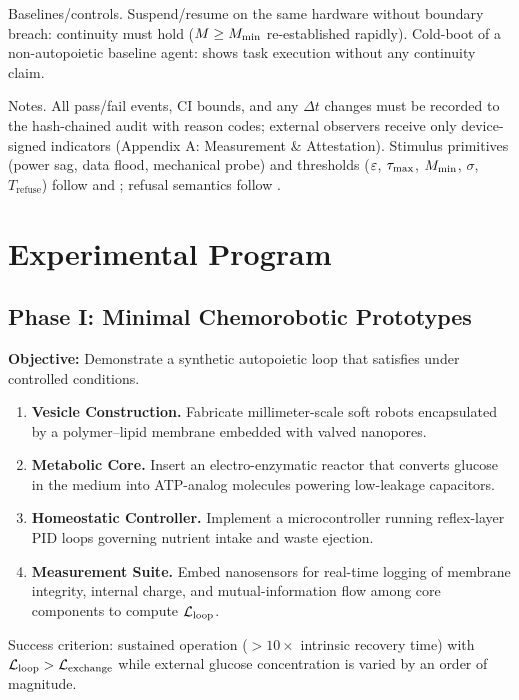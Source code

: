 \documentclass[11pt]{article}
\begin{document}
Baselines/controls. Suspend/resume on the same hardware without boundary breach: continuity must hold ($M \geq M_{\min}$ re-established rapidly). Cold-boot of a non-autopoietic baseline agent: shows task execution without any continuity claim.

Notes. All pass/fail events, CI bounds, and any $\Delta t$ changes must be recorded to the hash-chained audit with reason codes; external observers receive only device-signed indicators (Appendix A: Measurement \& Attestation). Stimulus primitives (power sag, data flood, mechanical probe) and thresholds ($\varepsilon$, $\tau_{\max}$, $M_{\min}$, $\sigma$, $T_{\text{refuse}}$) follow  and ; refusal semantics follow .

\section{Experimental Program}
\label{sec:experimental}

\prophetic

\subsection{Phase I: Minimal Chemorobotic Prototypes}
\label{sec:phase1}

\textbf{Objective:} Demonstrate a synthetic autopoietic loop that satisfies \NC under controlled conditions.

\begin{enumerate}
\item \textbf{Vesicle Construction.} Fabricate millimeter-scale soft robots encapsulated by a polymer--lipid membrane embedded with valved nanopores.
\item \textbf{Metabolic Core.} Insert an electro-enzymatic reactor that converts glucose in the medium into ATP-analog molecules powering low-leakage capacitors.
\item \textbf{Homeostatic Controller.} Implement a microcontroller running reflex-layer PID loops governing nutrient intake and waste ejection.
\item \textbf{Measurement Suite.} Embed nanosensors for real-time logging of membrane integrity, internal charge, and mutual-information flow among core components to compute $\mathcal{L}_{\text{loop}}$.
\end{enumerate}

Success criterion: sustained operation ($>10\times$ intrinsic recovery time) with $\mathcal{L}_{\text{loop}} > \mathcal{L}_{\text{exchange}}$ while external glucose concentration is varied by an order of magnitude.
\end{document}
